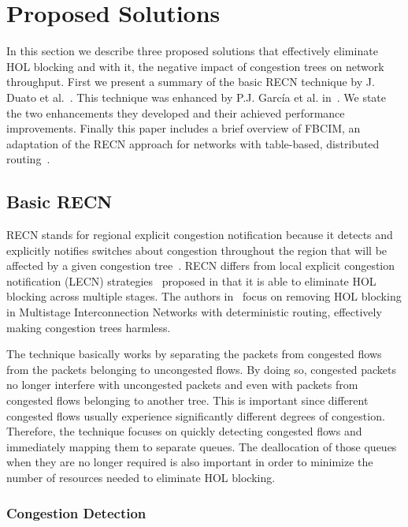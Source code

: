 \section{Proposed Solutions}\label{S:solutions}

In this section we describe three proposed solutions that effectively eliminate HOL blocking and with it, the negative impact of congestion trees on network throughput. First we present a summary of the basic RECN technique by J. Duato et al.~\cite{paper2}. This technique was enhanced by P.J. Garc\'ia et al. in~\cite{paper1}. We state the two enhancements they developed and their achieved performance improvements. Finally this paper includes a brief overview of FBCIM, an adaptation of the RECN approach for networks with table-based, distributed routing~\cite{paper3}. 

\subsection{Basic RECN}\label{S:basic_recn}

RECN stands for regional explicit congestion notification because it detects and explicitly notifies switches about congestion throughout the region that will be affected by a given congestion tree~\cite{paper2}. RECN differs from local explicit congestion notification (LECN) strategies~\cite{KM04} proposed in that it is able to eliminate HOL blocking across multiple stages. The authors in~\cite{paper2} focus on removing HOL blocking in Multistage Interconnection Networks with deterministic routing, effectively making congestion trees harmless. 

The technique basically works by separating the packets from congested flows from the packets belonging to uncongested flows. By doing so, congested packets no longer interfere with uncongested packets and even with packets from congested flows belonging to another tree. This is important since different congested flows usually experience significantly different degrees of congestion. Therefore, the technique focuses on quickly detecting congested flows and immediately mapping them to separate queues. The deallocation of those queues when they are no longer required is also important in order to minimize the number of resources needed to eliminate HOL blocking.

\subsubsection{Congestion Detection}


